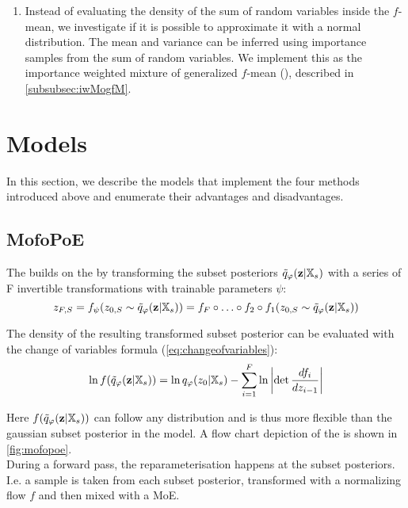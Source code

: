 \begin{enumerate}
    \item Instead of evaluating the density of the sum of random variables inside the $f$-mean, we investigate if it is possible to approximate it with a normal distribution.
    The mean and variance can be inferred using importance samples from the sum of random variables.
    We implement this as the importance weighted mixture of generalized $f$-mean (), described in \cref{subsubsec:iwMogfM}.

\end{enumerate}


\section{Models}
In this section, we describe the models that implement the four methods introduced above and enumerate their advantages and disadvantages.


\subsection{MofoPoE}\label{subsec:mofopoe}
The  builds on the  by transforming the subset posteriors $\tilde{q}_{\varphi}(\textbf{z}|\mathbb{X}_s)$ with a series of F invertible transformations with trainable parameters $\psi$:
\begin{equation}
    z_{F,S} =f_{\psi}(z_{0,S} \sim \tilde{q}_{\varphi}(\textbf{z}|\mathbb{X}_s)) = f_F \circ \ldots \circ f_2 \circ f_1(z_{0,S} \sim \tilde{q}_{\varphi}(\textbf{z}|\mathbb{X}_s))
\end{equation}

The density of the resulting transformed subset posterior can be evaluated with the change of variables formula (\cref{eq:changeofvariables}):
\begin{equation}
    \label{eq:changeofvariables_}
    \ln f(\tilde{q}_{\varphi}(\textbf{z}|\mathbb{X}_s)) = \ln q_{\varphi} (z_0|\mathbb{X}_s) - \sum _{i=1} ^{F}\ln \left|  \det \frac{df_i}{dz_{i-1}}\right|
\end{equation}

Here $f(\tilde{q}_{\varphi}(\textbf{z}|\mathbb{X}_s))$ can follow any distribution and is thus more flexible than the gaussian subset posterior in the  model.
A flow chart depiction of the  is shown in \cref{fig:mofopoe}.\\
During a forward pass, the reparameterisation happens at the subset posteriors.
I.e. a sample is taken from each subset posterior, transformed with a normalizing flow $f$ and then mixed with a MoE.

